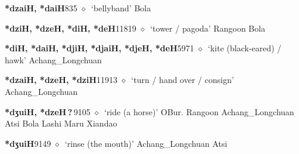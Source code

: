   \begin{list}{}{\leftmargin=1.5em \itemindent=-1.5em}
  \item {\footnotesize \textbf{*dzaiH, *daiH}}{\tiny 835}
         $\diamond$~`bellyband'
         Bola 
  \item {\footnotesize \textbf{*dziH, *dzeH, *diH, *deH}}{\tiny 11819}
\hspace{1ex}
         $\diamond$~`tower / pagoda'
         Rangoon 
\hspace{1ex}
         Bola 
  \item {\footnotesize \textbf{*diH, *daiH, *djiH, *djaiH, *djeH, *deH}}{\tiny 5971}
\hspace{1ex}
         $\diamond$~`kite (black-eared) / hawk'
         Achang\_Longchuan 
  \item {\footnotesize \textbf{*dzaiH, *dzeH, *dziH}}{\tiny 11913}
\hspace{1ex}
         $\diamond$~`turn / hand over / consign'
         Achang\_Longchuan 
  \item {\footnotesize \textbf{*dʒuiH, *dzeH\,?\,}}{\tiny 9105}
\hspace{1ex}
         $\diamond$~`ride (a horse)'
         OBur. 
\hspace{1ex}
         Rangoon 
\hspace{1ex}
         Achang\_Longchuan 
\hspace{1ex}
         Atsi 
\hspace{1ex}
         Bola 
\hspace{1ex}
         Lashi 
\hspace{1ex}
         Maru 
\hspace{1ex}
         Xiandao 
  \item {\footnotesize \textbf{*dʒuiH}}{\tiny 9149}
\hspace{1ex}
         $\diamond$~`rinse (the mouth)'
         Achang\_Longchuan 
\hspace{1ex}
         Atsi 
\hspace{1ex}

\end{list}
